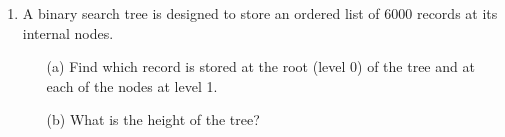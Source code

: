 \documentclass[]{article}
\begin{document}
\begin{enumerate}
\item A binary search tree is designed to store an ordered list of 6000 records at its internal nodes.
\begin{itemize}
\item[(a)] Find which record is stored at the root (level 0) of the tree and at each
of the nodes at level 1.
\item[(b)]  What is the height of the tree?
\end{itemize}
\end{enumerate}
\end{document}
